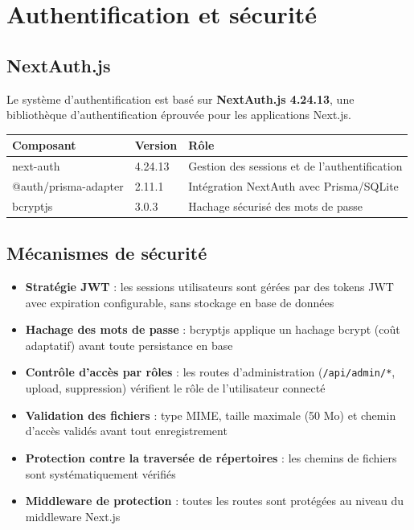 \documentclass[a4paper,12pt,french]{article}
\begin{document}

\section{Authentification et sécurité}

\subsection{NextAuth.js}

Le système d'authentification est basé sur \textbf{NextAuth.js 4.24.13}, une bibliothèque d'authentification éprouvée pour les applications Next.js.

\begin{tabularx}{\textwidth}{l l X}
\toprule
\textbf{Composant} & \textbf{Version} & \textbf{Rôle} \\
\midrule
next-auth & 4.24.13 & Gestion des sessions et de l'authentification \\
@auth/prisma-adapter & 2.11.1 & Intégration NextAuth avec Prisma/SQLite \\
bcryptjs & 3.0.3 & Hachage sécurisé des mots de passe \\
\bottomrule
\end{tabularx}

\subsection{Mécanismes de sécurité}

\begin{itemize}
  \item \textbf{Stratégie JWT} : les sessions utilisateurs sont gérées par des tokens JWT avec expiration configurable, sans stockage en base de données
  \item \textbf{Hachage des mots de passe} : bcryptjs applique un hachage bcrypt (coût adaptatif) avant toute persistance en base
  \item \textbf{Contrôle d'accès par rôles} : les routes d'administration (\texttt{/api/admin/*}, upload, suppression) vérifient le rôle de l'utilisateur connecté
  \item \textbf{Validation des fichiers} : type MIME, taille maximale (50 Mo) et chemin d'accès validés avant tout enregistrement
  \item \textbf{Protection contre la traversée de répertoires} : les chemins de fichiers sont systématiquement vérifiés
  \item \textbf{Middleware de protection} : toutes les routes sont protégées au niveau du middleware Next.js
\end{itemize}
\end{document}
